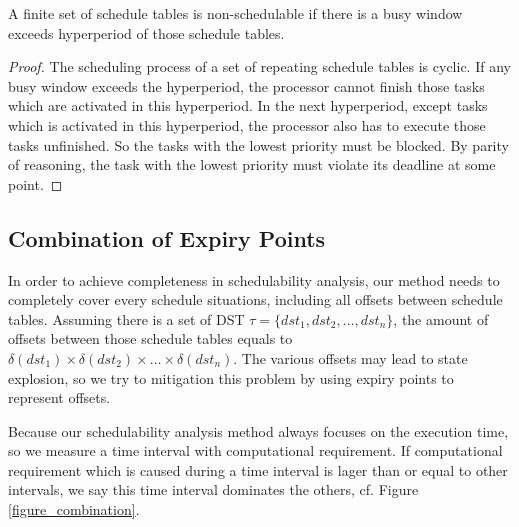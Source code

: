 \documentclass[sigconf]{acmart}
\begin{document}
\begin{lemma}
  A finite set of schedule tables is non-schedulable if there is a busy window exceeds hyperperiod of those schedule tables.
\end{lemma}\label{lemma_hyperperiod}
\begin{proof}
  The scheduling process of a set of repeating schedule tables is cyclic. If any busy window exceeds the hyperperiod, the processor cannot finish those tasks which are activated in this hyperperiod. In the next hyperperiod, except tasks which is activated in this hyperperiod, the processor also has to execute those tasks unfinished. So the tasks with the lowest priority must be blocked. By parity of reasoning, the task with the lowest priority must violate its deadline at some point.
\end{proof}
\subsection{Combination of Expiry Points}\label{section_combination}
In order to achieve completeness in schedulability analysis, our method needs to completely cover every schedule situations, including all offsets between schedule tables. Assuming there is a set of DST $\tau=\{dst_1,dst_2,\dots,dst_n\}$, the amount of offsets between those schedule tables equals to $\delta(dst_1)\times\delta(dst_2)\times\dots\times\delta(dst_n)$. The various offsets may lead to state explosion, so we try to mitigation this problem by using expiry points to represent offsets.

Because our schedulability analysis method always focuses on the execution time, so we measure a time interval with computational requirement. If computational requirement which is caused during a time interval is lager than or equal to other intervals, we say this time interval dominates the others, cf. Figure \ref{figure_combination}.
\end{document}
